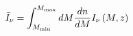 \begin{equation}
\bar{I}_{\nu} = \int_{M_{\rm min}}^{M_{\rm max}} dM \frac{dn}{dM} I_{\nu} \left(M, z \right)
\end{equation}
